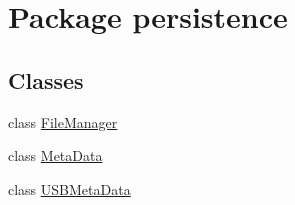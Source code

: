\hypertarget{namespacepersistence}{}\section{Package persistence}
\label{namespacepersistence}
\subsection*{Classes}
\begin{DoxyCompactItemize}
\item 
class \mbox{\hyperlink{classpersistence_1_1_file_manager}{File\+Manager}}
\item 
class \mbox{\hyperlink{classpersistence_1_1_meta_data}{Meta\+Data}}
\item 
class \mbox{\hyperlink{classpersistence_1_1_u_s_b_meta_data}{U\+S\+B\+Meta\+Data}}
\end{DoxyCompactItemize}
